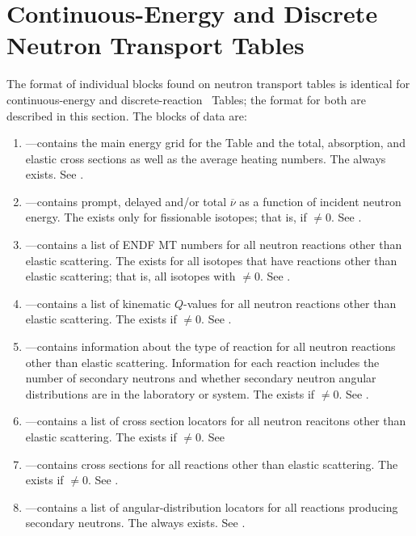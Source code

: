 \section{Continuous-Energy and Discrete Neutron Transport Tables}\label{sec:ContinuousEnergyNeutron}
The format of individual blocks found on neutron transport tables is identical for continuous-energy and discrete-reaction \ACE\ Tables; the format for both are described in this section. The blocks of data are:
\begin{enumerate}
  \item \textbf{}---contains the main energy grid for the Table and the total, absorption, and elastic cross sections as well as the average heating numbers. The  always exists. See .
  \item \textbf{}---contains prompt, delayed and/or total $\overline{\nu}$ as a function of incident neutron energy. The  exists only for fissionable isotopes; that is, if $\neq0$. See .
  \item \textbf{}---contains a list of ENDF MT numbers for all neutron reactions other than elastic scattering. The  exists for all isotopes that have reactions other than elastic scattering; that is, all isotopes with $\neq0$. See .
  \item \textbf{}---contains a list of kinematic $Q$-values for all neutron reactions other than elastic scattering. The  exists if $\neq0$. See .
  \item \textbf{}---contains information about the type of reaction for all neutron reactions other than elastic scattering. Information for each reaction includes the number of secondary neutrons and whether secondary neutron angular distributions are in the laboratory or \CM system. The  exists if $\neq0$. See .
  \item \textbf{}---contains a list of cross section locators for all neutron reacitons other than elastic scattering. The  exists if $\neq0$. See 
  \item \textbf{}---contains cross sections for all reactions other than elastic scattering. The  exists if $\neq0$. See .
  \item \textbf{}---contains a list of angular-distribution locators for all reactions producing secondary neutrons. The  always exists. See .

\end{enumerate}
